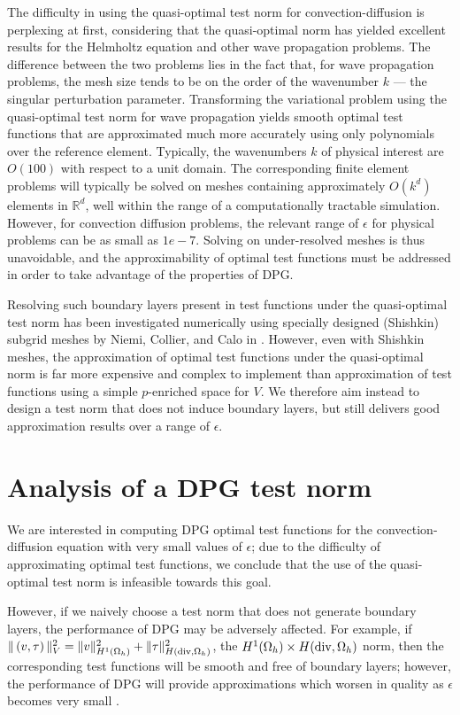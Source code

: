 \documentclass[11pt,onecolumn]{scrartcl}
\newcommand{\seclab}[1]{\label{sec:#1}}
\begin{document}
The difficulty in using the quasi-optimal test norm for convection-diffusion is perplexing at first, considering that the quasi-optimal norm has yielded excellent results for the Helmholtz equation and other wave propagation problems.  The difference between the two problems lies in the fact that, for wave propagation problems, the mesh size tends to be on the order of the wavenumber $k$ --- the singular perturbation parameter. Transforming the variational problem using the quasi-optimal test norm for wave propagation yields smooth optimal test functions that are approximated much more accurately using only polynomials over the reference element. Typically, the wavenumbers $k$ of physical interest are $O(100)$ with respect to a unit domain. The corresponding finite element problems will typically be solved on meshes containing approximately $O\!\left(k^d\right)$ elements in $\mathbb{R}^d$, well within the range of a computationally tractable simulation. However, for convection diffusion problems, the relevant range of $\epsilon$ for physical problems can be as small as $1e-7$. Solving on under-resolved meshes is thus unavoidable, and the approximability of optimal test functions must be addressed in order to take advantage of the properties of DPG.

Resolving such boundary layers present in test functions under the quasi-optimal test norm has been investigated numerically using specially designed (Shishkin) subgrid meshes by Niemi, Collier, and Calo in
\cite{DBLP:journals/procedia/NiemiCC11}.  However, even with Shishkin meshes, the approximation of optimal test functions under the quasi-optimal norm is far more expensive and complex to implement than approximation of test functions using a simple $p$-enriched space for $V$. We therefore aim instead to design a test norm that does not induce boundary layers, but still delivers good approximation results over a range of $\epsilon$.  

\section{Analysis of a DPG test norm}
\seclab{sec:testNormSec}
We are interested in computing DPG optimal test functions for the convection-diffusion equation with very small values of $\epsilon$; due to the difficulty of approximating optimal test functions, we conclude that the use of the quasi-optimal test norm is infeasible towards this goal. 

However, if we naively choose a test norm that does not generate boundary layers, the performance of DPG may be adversely affected. For example, if $\|\left(v,\tau\right)\|_V^2 = \|v\|_{H^1(\Omega_h)}^2 + \|\tau\|^2_{H({\rm div},\Omega_h)}$, the $H^1(\Omega_h)\times H({\rm div},\Omega_h)$ norm, then the corresponding test functions will be smooth and free of boundary layers; however, the performance of DPG will provide approximations which worsen in quality as $\epsilon$ becomes very small \cite{DPG3,DPGrobustness}. 
\end{document}
